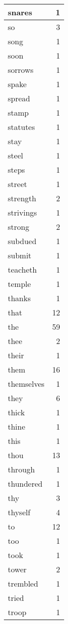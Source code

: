 \begin{center}
\begin{longtable}{l|r}
snares & 1 \\ \hline
so & 3 \\ \hline
song & 1 \\ \hline
soon & 1 \\ \hline
sorrows & 1 \\ \hline
spake & 1 \\ \hline
spread & 1 \\ \hline
stamp & 1 \\ \hline
statutes & 1 \\ \hline
stay & 1 \\ \hline
steel & 1 \\ \hline
steps & 1 \\ \hline
street & 1 \\ \hline
strength & 2 \\ \hline
strivings & 1 \\ \hline
strong & 2 \\ \hline
subdued & 1 \\ \hline
submit & 1 \\ \hline
teacheth & 1 \\ \hline
temple & 1 \\ \hline
thanks & 1 \\ \hline
that & 12 \\ \hline
the & 59 \\ \hline
thee & 2 \\ \hline
their & 1 \\ \hline
them & 16 \\ \hline
themselves & 1 \\ \hline
they & 6 \\ \hline
thick & 1 \\ \hline
thine & 1 \\ \hline
this & 1 \\ \hline
thou & 13 \\ \hline
through & 1 \\ \hline
thundered & 1 \\ \hline
thy & 3 \\ \hline
thyself & 4 \\ \hline
to & 12 \\ \hline
too & 1 \\ \hline
took & 1 \\ \hline
tower & 2 \\ \hline
trembled & 1 \\ \hline
tried & 1 \\ \hline
troop & 1 \\ \hline

\end{longtable}
\end{center}
